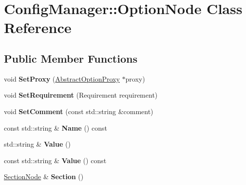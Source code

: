 \hypertarget{class_config_manager_1_1_option_node}{}\section{Config\+Manager\+:\+:Option\+Node Class Reference}
\label{class_config_manager_1_1_option_node}
\subsection*{Public Member Functions}
\begin{DoxyCompactItemize}
\item 
void {\bfseries Set\+Proxy} (\hyperlink{class_config_manager_1_1_abstract_option_proxy}{Abstract\+Option\+Proxy} $\ast$proxy)\hypertarget{class_config_manager_1_1_option_node_a6b11e372911679bd045e3ee1f43cf4ba}{}\label{class_config_manager_1_1_option_node_a6b11e372911679bd045e3ee1f43cf4ba}

\item 
void {\bfseries Set\+Requirement} (Requirement requirement)\hypertarget{class_config_manager_1_1_option_node_adfb4172e5929b7927243b60ba8d28485}{}\label{class_config_manager_1_1_option_node_adfb4172e5929b7927243b60ba8d28485}

\item 
void {\bfseries Set\+Comment} (const std\+::string \&comment)\hypertarget{class_config_manager_1_1_option_node_a58f8440e7549ce5785db09886e79e2a5}{}\label{class_config_manager_1_1_option_node_a58f8440e7549ce5785db09886e79e2a5}

\item 
const std\+::string \& {\bfseries Name} () const \hypertarget{class_config_manager_1_1_option_node_af9e6b47860fc8718236e3fe29f043cd0}{}\label{class_config_manager_1_1_option_node_af9e6b47860fc8718236e3fe29f043cd0}

\item 
std\+::string \& {\bfseries Value} ()\hypertarget{class_config_manager_1_1_option_node_aa33beb6d850388f3f6a41386d32164f1}{}\label{class_config_manager_1_1_option_node_aa33beb6d850388f3f6a41386d32164f1}

\item 
const std\+::string \& {\bfseries Value} () const \hypertarget{class_config_manager_1_1_option_node_a3cbcb849cc14c06121f658b4aab2f8de}{}\label{class_config_manager_1_1_option_node_a3cbcb849cc14c06121f658b4aab2f8de}

\item 
\hyperlink{class_config_manager_1_1_section_node}{Section\+Node} \& {\bfseries Section} ()\hypertarget{class_config_manager_1_1_option_node_a56ec62f82a04eeb275f711a38766a4b2}{}\label{class_config_manager_1_1_option_node_a56ec62f82a04eeb275f711a38766a4b2}


\end{DoxyCompactItemize}
